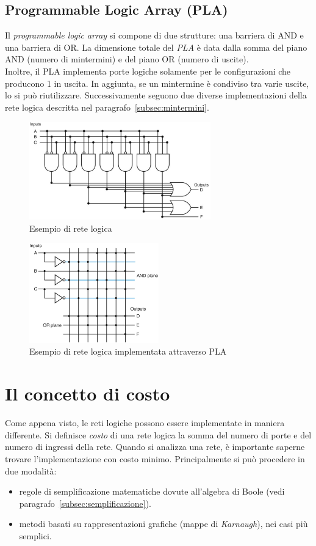 \documentclass[class=book, crop=false, oneside]{standalone}
\begin{document}
\subsection*{Programmable Logic Array (PLA)}
\label{subsec:pla}
Il \emph{programmable logic array} si compone di due strutture: una barriera di AND e una barriera di OR. La dimensione totale del \emph{PLA} è data dalla somma del piano AND (numero di mintermini) e del piano OR (numero di uscite).\\
Inoltre, il PLA implementa porte logiche solamente per le configurazioni che producono 1 in uscita. In aggiunta, se un mintermine è condiviso tra varie uscite, lo si può riutilizzare.
Successivamente seguono due diverse implementazioni della rete logica descritta nel paragrafo~\ref{subsec:mintermini}.
\begin{figure}[H]
	\centering
	\includegraphics[width=0.7\textwidth,keepaspectratio]{es_rete_logica.png}
	\caption{Esempio di rete logica}
\end{figure}
\begin{figure}[H]
	\centering
	\includegraphics[width=0.5\textwidth,keepaspectratio]{es_pla.png}
	\caption{Esempio di rete logica implementata attraverso PLA}
\end{figure}

\section{Il concetto di costo}
Come appena visto, le reti logiche possono essere implementate in maniera differente. Si definisce \emph{costo} di una rete logica la somma del numero di porte e del numero di ingressi della rete. Quando si analizza una rete, è importante saperne trovare l'implementazione con costo minimo. Principalmente si può procedere in due modalità:
\begin{itemize}[noitemsep]
	\item regole di semplificazione matematiche dovute all'algebra di Boole (vedi paragrafo~\ref{subsec:semplificazione}).
	\item metodi basati su rappresentazioni grafiche (mappe di \emph{Karnaugh}), nei casi più semplici.
\end{itemize}
\end{document}

